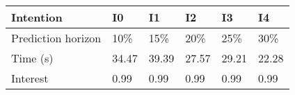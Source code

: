 \begin{tabular}{llllll}
\toprule
Intention & I0 & I1 & I2 & I3 & I4 \\
\midrule
Prediction horizon & 10\% & 15\% & 20\% & 25\% & 30\% \\
Time (s) & 34.47 & 39.39 & 27.57 & 29.21 & 22.28 \\
Interest & 0.99 & 0.99 & 0.99 & 0.99 & 0.99 \\
\bottomrule
\end{tabular}
